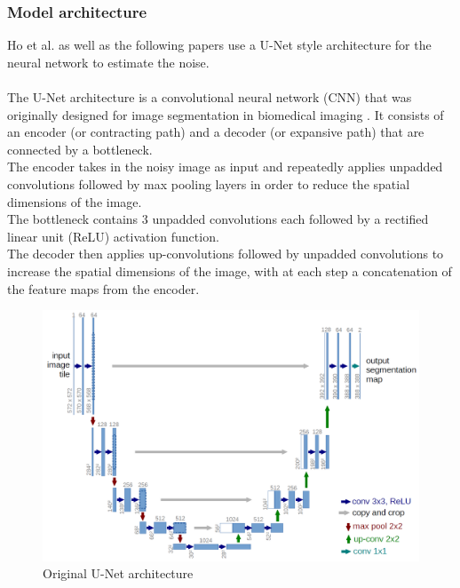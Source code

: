 \documentclass{article}
\begin{document}
\subsubsection{Model architecture}
Ho et al. \cite{ho2020denoising} as well as the following papers \cite{song2022denoising, nichol2021improved, dhariwal2021diffusion} use a U-Net style architecture for the neural network to estimate the noise. 
\\\\
The U-Net architecture is a convolutional neural network (CNN) that was originally designed for image segmentation in biomedical imaging \cite{ronneberger2015unet}. It consists of an encoder (or contracting path) and a decoder (or expansive path) that are connected by a bottleneck. \\
The encoder takes in the noisy image as input and repeatedly applies unpadded convolutions followed by max pooling layers in order to reduce the spatial dimensions of the image. \cite{ronneberger2015unet} \\
The bottleneck contains 3 unpadded convolutions each followed by a rectified linear unit (ReLU) activation function. \cite{ronneberger2015unet} \\
The decoder then applies up-convolutions followed by unpadded convolutions to increase the spatial dimensions of the image, with at each step a concatenation of the feature maps from the encoder. \cite{ronneberger2015unet}
\begin{figure}[h]
  \includegraphics[width=\textwidth]{images/unet.png}
  \caption{Original U-Net architecture \cite{ronneberger2015unet}}
\end{figure}
\\\\
\end{document}
